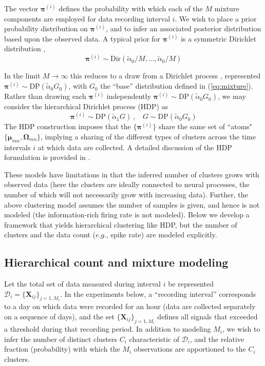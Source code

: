 \documentclass[journal]{IEEEtran}
\def\bf{\mathbf}
\newcommand{\beq}{\begin{equation}}
\newcommand{\eeq}{\end{equation}}
\newcommand{\Xmat}{{\bf X}}
\newcommand{\Omegamat}{\boldsymbol{\Omega}}
\newcommand{\muv}{\boldsymbol{\mu}}
\newcommand{\piv}{\boldsymbol{\pi}}
\begin{document}
The vector $\piv^{(i)}$ defines the probability with which each of the $M$ mixture components are employed for data recording interval $i$. We wish to place a prior probability distribution on $\piv^{(i)}$, and to infer an associated posterior distribution based upon the observed data.
A typical prior for $\piv^{(i)}$ is a symmetric Dirichlet distribution \cite{Dilan},
\beq \piv^{(i)}\sim\mbox{Dir}(\tilde{\alpha}_0/M,\dots,\tilde{\alpha}_0/M)\label{eq:Dir}\eeq

In the limit $M\rightarrow\infty$ this reduces to a draw from a Dirichlet process \cite{Wood2009,Bo2011}, represented $\piv^{(i)}\sim\mbox{DP}(\tilde{\alpha}_0 G_0)$, with $G_0$ the ``base'' distribution defined in (\ref{eq:mixture}). Rather than drawing each $\piv^{(i)}$ independently $\piv^{(i)}\sim\mbox{DP}(\tilde{\alpha}_0 G_0)$, we may consider the hierarchical Dirichlet process (HDP) \cite{HDP} as
\beq \piv^{(i)}\sim\mbox{DP}(\tilde{\alpha}_1 G)~,~~~~G\sim\mbox{DP}(\tilde{\alpha}_0 G_0)\eeq
The HDP construction imposes that the $\{\piv^{(i)}\}$ share the same set of ``atoms" $\{\muv_{mn},\Omegamat_{mn}\}$, implying
a sharing of the different types of clusters across the time intervals $i$ at which data are collected. A detailed discussion of the HDP formulation is provided in \cite{Bo2011}.

These models have limitations in that the inferred number of clusters grows with observed data (here the clusters are ideally connected to neural processes, the number of which will not necessarily grow with increasing data). Further, the above clustering model assumes the number of samples is given, and hence is not modeled (the information-rich firing rate is not modeled).
Below we develop a framework that yields hierarchical clustering like HDP, but the number of clusters and the data count ($e.g.$, spike rate) are modeled explicitly.

\subsection{Hierarchical count and mixture modeling\label{sec:focused}}

Let the total set of data measured during interval $i$ be represented $\bm{\mathcal{D}}_i=\{\Xmat_{ij}\}_{j=1,M_i}$. In the experiments below, a ``recording interval'' corresponds to a day on which data were recorded for an hour (data are collected separately on a sequence of days), and the set $\{\Xmat_{ij}\}_{j=1,M_i}$ defines all signals that exceeded a threshold during that recording period. In addition to modeling $M_i$, we wish to infer the number of distinct clusters $C_i$ characteristic of $\bm{\mathcal{D}}_i$, and the relative fraction (probability) with which the $M_i$ observations are apportioned to the $C_i$ clusters.
\end{document}
